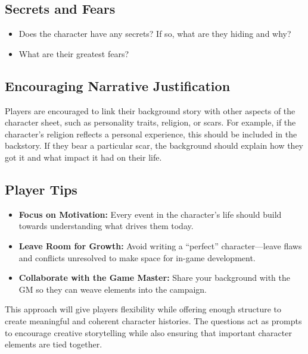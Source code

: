 \documentclass[12pt]{book}
\begin{document}
\subsection*{Secrets and Fears}

\begin{itemize}
    \item Does the character have any secrets? If so, what are they hiding and why?
    \item What are their greatest fears?
\end{itemize}

\subsection*{Encouraging Narrative Justification}

Players are encouraged to link their background story with other aspects of the character sheet, such as personality traits, religion, or scars. For example, if the character's religion reflects a personal experience, this should be included in the backstory. If they bear a particular scar, the background should explain how they got it and what impact it had on their life.

\subsection*{Player Tips}

\begin{itemize}
    \item \textbf{Focus on Motivation:} Every event in the character's life should build towards understanding what drives them today.
    \item \textbf{Leave Room for Growth:} Avoid writing a ``perfect'' character—leave flaws and conflicts unresolved to make space for in-game development.
    \item \textbf{Collaborate with the Game Master:} Share your background with the GM so they can weave elements into the campaign.
\end{itemize}

This approach will give players flexibility while offering enough structure to create meaningful and coherent character histories. The questions act as prompts to encourage creative storytelling while also ensuring that important character elements are tied together.

\end{document}
